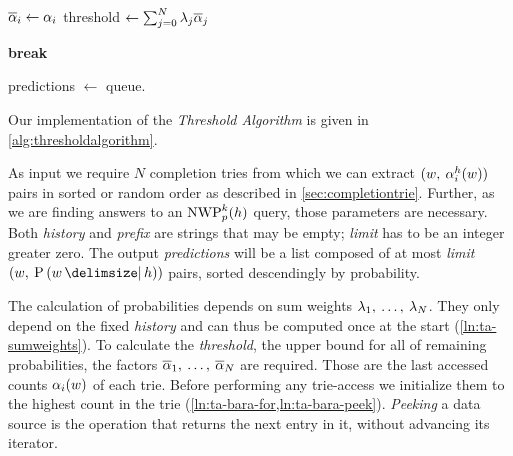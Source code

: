 \begin{algorithm}
\begin{algorithmic}[1]
      \vspace{0.7em}
      \State $\overline{\alpha}_i \gets \alpha_i$
        \label{ln:ta-bara-update}
      \State threshold $\gets \sum_{j = 0}^N \lambda_j \overline{\alpha}_j$
        \label{ln:ta-threshold}

      \vspace{0.7em}
        \label{ln:ta-done-if-2}
        \State \textbf{break}
          \label{ln:ta-done-break}
      \EndIf
    \EndWhile

    \vspace{0.7em}
    \State predictions $\gets$ queue.
      \label{ln:ta-tolist}
  \end{algorithmic}
\end{algorithm}

Our implementation of the \emph{Threshold Algorithm} is given in
\cref{alg:thresholdalgorithm}.

As input we require $N$ completion tries from which we can extract
$(w, \: \alpha^h_i(w))$ pairs in sorted or random order as described in
\cref{sec:completiontrie}.
Further, as we are finding answers to an $\NWP[p][k]{h}$ query, those parameters
are necessary.
Both \emph{history} and \emph{prefix} are strings that may be empty;
\emph{limit} has to be an integer greater zero.
The output \emph{predictions} will be a list composed of at most
\emph{limit} $(w, \: \Prob{w}{h})$ pairs, sorted descendingly by probability.

The calculation of probabilities depends on sum weights
$\lambda_1, \: \ldots, \: \lambda_N$.
They only depend on the fixed \emph{history} and can thus be computed once at
the start (\cref{ln:ta-sumweights}).
To calculate the \emph{threshold}, the upper bound for all of remaining
probabilities, the factors
$\overline{\alpha}_1, \: \ldots, \: \overline{\alpha}_N$ are required.
Those are the last accessed counts $\alpha_i(w)$ of each trie.
Before performing any trie-access we initialize them to the highest count in the
trie (\cref{ln:ta-bara-for,ln:ta-bara-peek}).
\emph{Peeking} a data source is the operation that returns the next entry in it,
without advancing its iterator.

